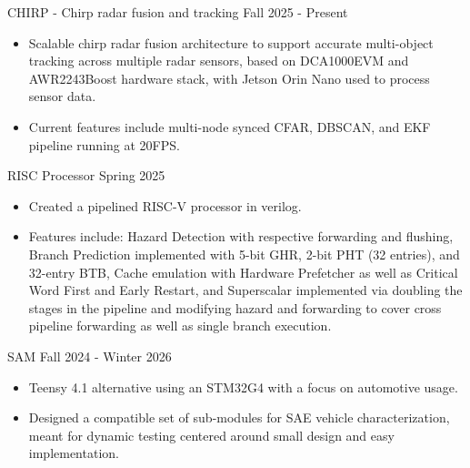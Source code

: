 \documentclass[9pt]{developercv} %
\begin{document}
\vspace{-16 pt}
\begin{entrylist}
    \entry
    {}
    {CHIRP - Chirp radar fusion and tracking }
    {Fall 2025 - Present}
    {\vspace{-4pt}
    \begin{itemize}[noitemsep,topsep=0pt,parsep=0pt,partopsep=0pt, leftmargin=10pt]
        \item Scalable chirp radar fusion architecture to support accurate multi-object tracking across multiple radar sensors, based on DCA1000EVM and AWR2243Boost hardware stack, with Jetson Orin Nano used to process sensor data.
        \item Current features include multi-node synced CFAR, DBSCAN, and EKF pipeline running at 20FPS.
    \end{itemize}
    }

    \entry
    {}
    {RISC Processor}
    {Spring 2025}
    {\vspace{-4pt}
    \begin{itemize}[noitemsep,topsep=0pt,parsep=0pt,partopsep=0pt, leftmargin=10pt]
    \item Created a pipelined RISC-V processor in verilog.
    \item Features include: Hazard Detection with respective forwarding and flushing, Branch Prediction implemented with  5-bit GHR, 2-bit PHT (32 entries), and 32-entry BTB, Cache emulation with Hardware Prefetcher as well as Critical Word First and Early Restart, and Superscalar implemented via doubling the stages in the pipeline and modifying hazard and forwarding to cover cross pipeline forwarding as well as single branch execution.
    \end{itemize}
    }

    \entry
    {}
    {SAM}
    {Fall 2024 - Winter 2026}
    {\vspace{-8pt}
    \begin{itemize}[noitemsep,topsep=0pt,parsep=0pt,partopsep=0pt, leftmargin=10pt]
    \item Teensy 4.1 alternative using an STM32G4 with a focus on automotive usage.
    \item Designed a compatible set of sub-modules for SAE vehicle characterization, meant for dynamic testing centered around small design and easy implementation.
    \end{itemize}
    }
\end{entrylist}
\end{document}
